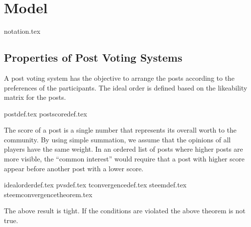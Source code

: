 \section{Model}
  {notation.tex}
  \subsection{Properties of Post Voting Systems}
    A post voting system has the objective to arrange the posts according to the
    preferences of the participants. The ideal order is defined based on the
    likeability matrix for the posts.

    {postdef.tex}
    {postscoredef.tex}

    The score of a post is a single number that represents its overall worth to
    the community. By using simple summation, we assume that the opinions of all
    players have the same weight. In an ordered list of posts where higher posts
    are more visible, the ``common interest'' would require that a post with
    higher score appear before another post with a lower score.

    {idealorderdef.tex}
    {pvsdef.tex}
    {tconvergencedef.tex}
    {steemdef.tex}
    {steemconvergencetheorem.tex}

    The above result is tight.
    If the conditions are violated the above theorem is not true.
